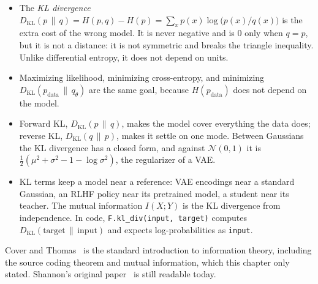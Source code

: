 \begin{itemize}
    model's loss starts near $\log V$, its perplexity is
    $e^{\text{loss}}$, and its loss cannot go below the entropy of the
    text. In code, compute the loss from logits with log-sum-exp, and
    pass logits, not probabilities, to \texttt{F.cross\_entropy}.
  \item The \emph{KL divergence} $D_{\mathrm{KL}}(p \,\|\, q) = H(p, q) -
    H(p) = \sum_x p(x) \log\bigl(p(x)/q(x)\bigr)$ is the extra cost of
    the wrong model. It is never negative and is $0$ only when $q = p$,
    but it is not a distance: it is not symmetric and breaks the triangle
    inequality. Unlike differential entropy, it does not depend on units.
  \item Maximizing likelihood, minimizing cross-entropy, and minimizing
    $D_{\mathrm{KL}}(p_{\text{data}} \,\|\, q_\theta)$ are the same goal,
    because $H(p_{\text{data}})$ does not depend on the model.
  \item Forward KL, $D_{\mathrm{KL}}(p \,\|\, q)$, makes the model cover
    everything the data does; reverse KL, $D_{\mathrm{KL}}(q \,\|\, p)$,
    makes it settle on one mode. Between Gaussians the KL divergence has
    a closed form, and against $\mathcal{N}(0, 1)$ it is $\tfrac12(\mu^2
    + \sigma^2 - 1 - \log \sigma^2)$, the regularizer of a VAE.
  \item KL terms keep a model near a reference: VAE encodings near a
    standard Gaussian, an RLHF policy near its pretrained model, a student
    near its teacher. The mutual information $I(X; Y)$ is the KL
    divergence from independence. In code, \texttt{F.kl\_div(input,
    target)} computes $D_{\mathrm{KL}}(\text{target} \,\|\, \text{input})$
    and expects log-probabilities as \texttt{input}.
\end{itemize}

Cover and Thomas~\cite{cover2006elements} is the standard introduction to
information theory, including the source coding theorem and mutual
information, which this chapter only stated. Shannon's original
paper~\cite{shannon1948mathematical} is still readable today.
